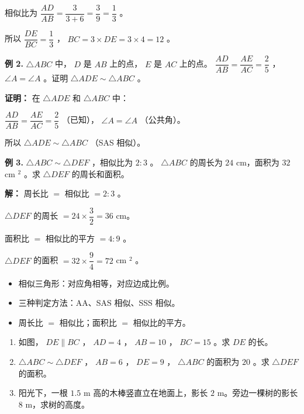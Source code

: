 \begin{workedexamples}
相似比为 $\dfrac{AD}{AB} = \dfrac{3}{3 + 6} = \dfrac{3}{9} = \dfrac{1}{3}$ 。

所以 $\dfrac{DE}{BC} = \dfrac{1}{3}$ ， $BC = 3 \times DE = 3 \times 4 = 12$ 。

\textbf{例 2.} $\triangle ABC$ 中， $D$ 是 $AB$ 上的点， $E$ 是 $AC$ 上的点。 $\dfrac{AD}{AB} = \dfrac{AE}{AC} = \dfrac{2}{5}$ ， $\angle A = \angle A$ 。证明 $\triangle ADE \sim \triangle ABC$ 。

\textbf{证明：}
在 $\triangle ADE$ 和 $\triangle ABC$ 中：

$\dfrac{AD}{AB} = \dfrac{AE}{AC} = \dfrac{2}{5}$ （已知）， $\angle A = \angle A$ （公共角）。

所以 $\triangle ADE \sim \triangle ABC$ （SAS 相似）。

\textbf{例 3.} $\triangle ABC \sim \triangle DEF$ ，相似比为 $2:3$ 。 $\triangle ABC$ 的周长为 $24$ cm，面积为 $32$ cm $^2$ 。求 $\triangle DEF$ 的周长和面积。

\textbf{解：}
周长比 $=$ 相似比 $= 2:3$ 。

$\triangle DEF$ 的周长 $= 24 \times \dfrac{3}{2} = 36$ cm。

面积比 $=$ 相似比的平方 $= 4:9$ 。

$\triangle DEF$ 的面积 $= 32 \times \dfrac{9}{4} = 72$ cm $^2$ 。

\end{workedexamples}

\begin{keytakeaway}


\begin{itemize}
  \item 相似三角形：对应角相等，对应边成比例。
  \item 三种判定方法：AA、SAS 相似、SSS 相似。
  \item 周长比 $=$ 相似比；面积比 $=$ 相似比的平方。
\end{itemize}


\end{keytakeaway}

\begin{practice}


\begin{enumerate}
  \item 如图， $DE \parallel BC$ ， $AD = 4$ ， $AB = 10$ ， $BC = 15$ 。求 $DE$ 的长。
  \item $\triangle ABC \sim \triangle DEF$ ， $AB = 6$ ， $DE = 9$ ， $\triangle ABC$ 的面积为 $20$ 。求 $\triangle DEF$ 的面积。
  \item 阳光下，一根 $1.5$ m 高的木棒竖直立在地面上，影长 $2$ m。旁边一棵树的影长 $8$ m，求树的高度。
\end{enumerate}


\end{practice}




